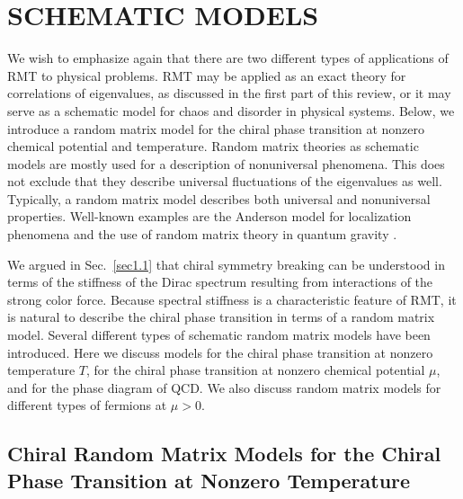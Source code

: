 \section{SCHEMATIC MODELS}
\label{models}

We wish to emphasize again that
there are two different types of applications of RMT
to physical problems. RMT may be applied as an exact theory for
correlations of eigenvalues, as discussed in the first
part of this review, or it may serve as a schematic model
for chaos and disorder in physical systems. 
Below, we introduce a random matrix
model for the chiral phase transition at nonzero chemical potential
and temperature. Random matrix theories as schematic models are mostly
used for a description of nonuniversal phenomena.  This does not
exclude that they describe universal fluctuations of the eigenvalues
as well.  Typically, a random matrix model describes both universal
and nonuniversal properties.
Well-known examples are the Anderson model for localization phenomena
\cite{Ande58} and the use of random matrix theory in quantum gravity
\cite{Ginsparg,Dalmazi}.  

We argued in Sec.~\ref{sec1.1} that chiral symmetry breaking can
be understood in terms of the stiffness of the Dirac spectrum
resulting from interactions of the strong color force.  Because spectral
stiffness is a characteristic feature of RMT, it is
natural to describe the chiral phase transition in terms of a
random matrix model.  Several different types of schematic random
matrix models have been introduced. Here we discuss models for the
chiral phase transition at nonzero temperature $T$, for the chiral
phase transition at nonzero chemical potential $\mu$, and for the
phase diagram of QCD.  We also discuss random matrix models for
different types of fermions at $\mu>0$.

\subsection{Chiral Random Matrix Models for the Chiral Phase
  Transition at Nonzero Temperature}
\label{modelT}

